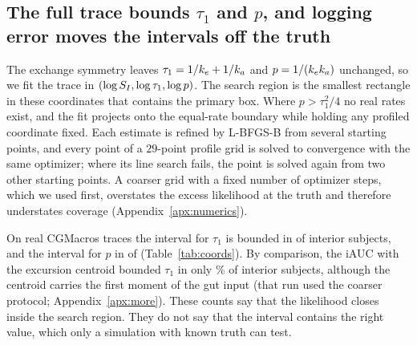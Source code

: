 \subsection{The full trace bounds \texorpdfstring{$\tau_1$ and $p$}{tau1 and p}, and logging error moves the intervals off the truth}
\label{sec:more}

The exchange symmetry leaves $\tau_1=1/k_e+1/k_a$ and $p=1/(k_ek_a)$ unchanged, so we fit the trace in $(\log S_I,\log\tau_1,\log p)$.
The search region is the smallest rectangle in these coordinates that contains the primary box.
Where $p>\tau_1^2/4$ no real rates exist, and the fit projects onto the equal-rate boundary while holding any profiled coordinate fixed.
Each estimate is refined by L-BFGS-B from several starting points, and every point of a $29$-point profile grid is solved to convergence with the same optimizer; where its line search fails, the point is solved again from two other starting points.
A coarser grid with a fixed number of optimizer steps, which we used first, overstates the excess likelihood at the truth and therefore understates coverage (Appendix~\ref{apx:numerics}).

On real CGMacros traces the interval for $\tau_1$ is bounded in \resCRealNTauBd{} of \resCRealNTauInt{} interior subjects, and the interval for $p$ in \resCRealNPBd{} of \resCRealNPInt{} (Table~\ref{tab:coords}).
By comparison, the iAUC with the excursion centroid bounded $\tau_1$ in only \resCoordsBoundedTauCentroid\% of interior subjects, although the centroid carries the first moment of the gut input (that run used the coarser protocol; Appendix~\ref{apx:more}).
These counts say that the likelihood closes inside the search region.
They do not say that the interval contains the right value, which only a simulation with known truth can test.

